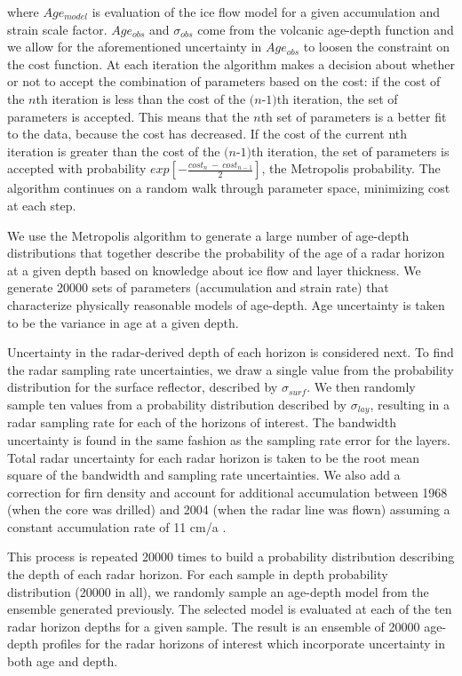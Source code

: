 \documentclass[12pt]{article}
\begin{document}
where $Age_{model}$ is evaluation of the \citet{morland2009} ice flow model for a given accumulation and strain scale factor. $Age_{obs}$ and $\sigma_{obs}$ come from the volcanic age-depth function and we allow for the aforementioned uncertainty in $Age_{obs}$ to loosen the constraint on the cost function. At each iteration the algorithm makes a decision about whether or not to accept the combination of parameters based on the cost: if the cost of the $\textit{n}$th iteration is less than the cost of the $\textit{(n-1)}$th iteration, the set of parameters is accepted. This means that the $\textit{n}$th set of parameters is a better fit to the data, because the cost has decreased. If the cost of the current nth iteration is greater than the cost of the $\textit{(n-1)}$th iteration, the set of parameters is accepted with probability $exp[-\frac{cost_n~-~cost_{n-1}}{2}]$, the Metropolis probability. The algorithm continues on a random walk through parameter space, minimizing cost at each step.

We use the Metropolis algorithm to generate a large number of age-depth distributions that together describe the probability of the age of a radar horizon at a given depth based on knowledge about ice flow and layer thickness. We generate 20000 sets of parameters (accumulation and strain rate) that characterize physically reasonable models of age-depth. Age uncertainty is taken to be the variance in age at a given depth. 

Uncertainty in the radar-derived depth of each horizon is considered next. To find the radar sampling rate uncertainties, we draw a single value from the probability distribution for the surface reflector, described by $\sigma_{surf}$. We then randomly sample ten values from a probability distribution described by $\sigma_{lay}$, resulting in a radar sampling rate for each of the horizons of interest. The bandwidth uncertainty is found in the same fashion as the sampling rate error for the layers. Total radar uncertainty for each radar horizon is taken to be the root mean square of the bandwidth and sampling rate uncertainties. We also add a correction for firn density and account for additional accumulation between 1968 (when the core was drilled) and 2004 (when the radar line was flown) assuming a constant accumulation rate of 11 cm/a \cite{hammer1994}. 

This process is repeated 20000 times to build a probability distribution describing the depth of each radar horizon. For each sample in depth probability distribution (20000 in all), we randomly sample an age-depth model from the ensemble generated previously. The selected model is evaluated at each of the ten radar horizon depths for a given sample. The result is an ensemble of 20000 age-depth profiles for the radar horizons of interest which incorporate uncertainty in both age and depth.
\end{document}
